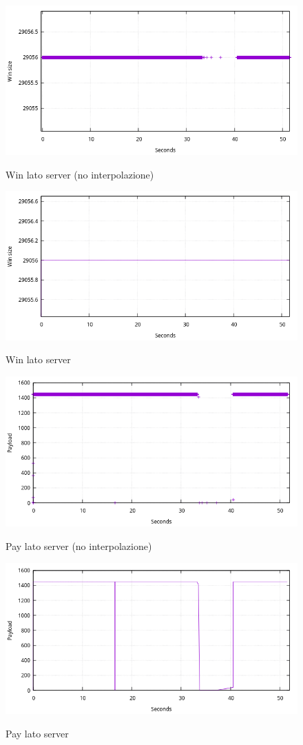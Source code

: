 \documentclass[12pt]{article}
\begin{document}
\begin{figure}[H]
	\center
	\includegraphics[width=0.75\linewidth]{server_win_point.png}
	\label{eth}
	\caption{Win lato server (no interpolazione)}
\end{figure}

\begin{figure}[H]
	\center
	\includegraphics[width=0.75\linewidth]	{server_win_lines.png}
	\label{eth}
	\caption{Win lato server}
\end{figure}

\begin{figure}[H]
	\center
	\includegraphics[width=0.75\linewidth]{server_pay_points.png}
	\label{eth}
	\caption{Pay lato server (no interpolazione)}
\end{figure}

\begin{figure}[H]
	\center
	\includegraphics[width=0.75\linewidth]{server_pay_lines.png}
	\label{eth}
	\caption{Pay lato server}
\end{figure}
\end{document}

